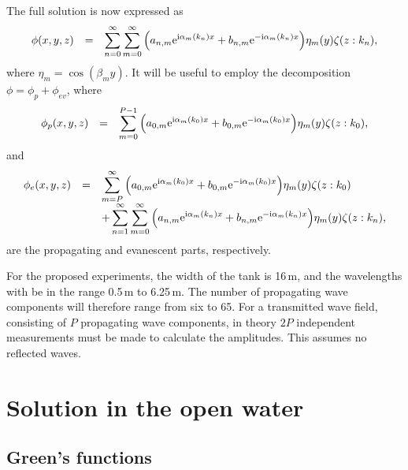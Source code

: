 \documentclass[12pt,a4paper]{article}
\def\ci{{\mathrm i}}
\renewcommand{\exp}{{\rm e}}
\newcommand{\ds}{\displaystyle}
\newcommand{\vp}{{\phi}}
\newcommand{\vm}{{\zeta}}
\newcommand{\ym}{{\eta}}
\newcommand{\kx}{\alpha}
\newcommand{\ky}{\beta}
\begin{document}
The full solution is now expressed as
\begin{equation}
\label{eq:PotOW}
\begin{array}{rcl}
\vp(x,y,z)
&
=
&
\ds
\sum_{n=0}^{\infty}
\sum_{m=0}^{\infty}
\Big(
a_{n,m}\exp^{\ci\kx_{m}(k_{n}) x}
+
b_{n,m}\exp^{-\ci\kx_{m}(k_{n}) x}
\Big)
\ym_{m}(y)
\vm(z:k_{n}),
\end{array}
\end{equation}
where $\ym_{m}=\cos(\ky_{m}y)$.
It will be useful to employ the decomposition $\vp=\vp_{p}+\vp_{ev}$, where
\begin{equation}
\begin{array}{rcl}
\vp_{p}(x,y,z)
&
=
&
\ds
\sum_{m=0}^{P-1}
\Big(
a_{0,m}\exp^{\ci\kx_{m}(k_{0}) x}
+
b_{0,m}\exp^{-\ci\kx_{m}(k_{0}) x}
\Big)
\ym_{m}(y)
\vm(z:k_{0}),
\end{array}
\end{equation}
and
\begin{equation}
\begin{array}{rcl}
\vp_{e}(x,y,z)
&
=
&
\ds
\sum_{m=P}^{\infty}
\Big(
a_{0,m}\exp^{\ci\kx_{m}(k_{0}) x}
+
b_{0,m}\exp^{-\ci\kx_{m}(k_{0}) x}
\Big)
\ym_{m}(y)
\vm(z:k_{0})
\\[8pt]
&
&
\ds
+
\sum_{n=1}^{\infty}
\sum_{m=0}^{\infty}
\Big(
a_{n,m}\exp^{\ci\kx_{m}(k_{n}) x}
+
b_{n,m}\exp^{-\ci\kx_{m}(k_{n}) x}
\Big)
\ym_{m}(y)
\vm(z:k_{n}),
\end{array}
\end{equation}
are the propagating and evanescent parts, respectively.

For the proposed experiments, the width of the tank is 16\,m, and the wavelengths with be in the range 0.5\,m to 6.25\,m.
The number of propagating wave components will therefore range from six to 65.
For a transmitted wave field, consisting of $P$ propagating wave components, in theory $2P$ independent measurements must be made to calculate the amplitudes.
This assumes no reflected waves.


\section{Solution in the open water}
\label{sec2}


\subsection{Green's functions}
\end{document}

